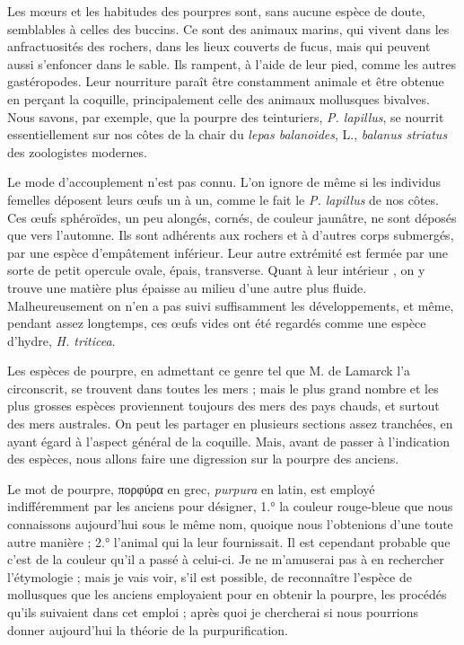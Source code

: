 \documentclass[a4paper, 11pt, oneside, polutonikogreek, french]{article}
\begin{document}
Les mœurs et les habitudes des pourpres sont, sans aucune espèce de doute, semblables à celles des buccins. Ce sont des animaux marins, qui vivent dans les anfractuosités des rochers, dans les lieux couverts de fucus, mais qui peuvent aussi s'enfoncer dans le sable. Ils rampent, à l'aide de leur pied, comme les autres gastéropodes. Leur nourriture paraît être constamment animale et être obtenue en perçant la coquille, principalement celle des animaux mollusques bivalves. Nous savons, par exemple, que la pourpre des teinturiers, \emph{P. lapillus}, se nourrit essentiellement sur nos côtes de la chair du \emph{lepas balanoides}, L., \emph{balanus striatus} des zoologistes modernes.

Le mode d'accouplement n'est pas connu. L'on ignore de même si les individus femelles déposent leurs œufs un à un, comme le fait le \emph{P. lapillus} de nos côtes. Ces œufs sphéroïdes, un peu alongés, cornés, de couleur jaunâtre, ne sont déposés que vers l'automne. Ils sont adhérents aux rochers et à d'autres corps submergés, par une espèce d'empâtement inférieur. Leur autre extrémité est fermée par une sorte de petit opercule ovale, épais, transverse. Quant à leur intérieur , on y trouve une matière plus épaisse au milieu d'une autre plus fluide. Malheureusement on n'en a pas suivi suffisamment les développements, et même, pendant assez longtemps, ces œufs vides ont été regardés comme une espèce d'hydre, \emph{H. triticea}.

Les espèces de pourpre, en admettant ce genre tel que M. de Lamarck l'a circonscrit, se trouvent dans toutes les mers ; mais le plus grand nombre et les plus grosses espèces proviennent toujours des mers des pays chauds, et surtout des mers australes. On peut les partager en plusieurs sections assez tranchées, en ayant égard à l'aspect général de la coquille. Mais, avant de passer à l'indication des espèces, nous allons faire une digression sur la pourpre des anciens.

Le mot de pourpre, πορφύρα en grec, \emph{purpura} en latin, est employé indifféremment par les anciens pour désigner, 1.° la couleur rouge-bleue que nous connaissons aujourd'hui sous le même nom, quoique nous l'obtenions d'une toute autre manière ; 2.° l'animal qui la leur fournissait. Il est cependant probable que c'est de la couleur qu'il a passé à celui-ci. Je ne m'amuserai pas à en rechercher l'étymologie ; mais je vais voir, s'il est possible, de reconnaître l'espèce de mollusques que les anciens employaient pour en obtenir la pourpre, les procédés qu'ils suivaient dans cet emploi ; après quoi je chercherai si nous pourrions donner aujourd'hui la théorie de la purpurification.
\end{document}
